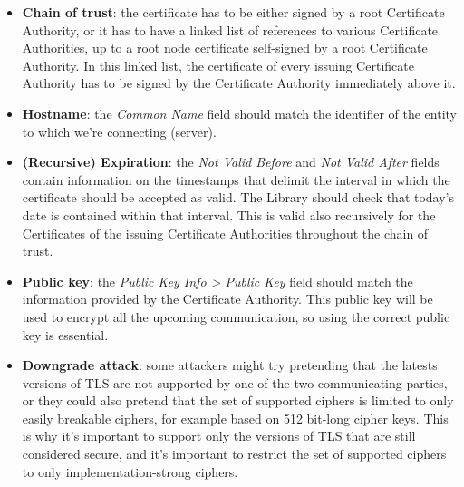 \documentclass[binding=0.6cm,noexaminfo]{sapthesis}
\begin{document}
\begin{itemize}
	\item \textbf{Chain of trust}: the certificate has to be either signed by a root Certificate Authority, or it has to have a linked list of references to various Certificate Authorities, up to a root node certificate self-signed by a root Certificate Authority. In this linked list, the certificate of every issuing Certificate Authority has to be signed by the Certificate Authority immediately above it.
	\item \textbf{Hostname}: the \textit{Common Name} field should match the identifier of the entity to which we’re connecting (server).
	\item \textbf{(Recursive) Expiration}: the \textit{Not Valid Before} and \textit{Not Valid After} fields contain information on the timestamps that delimit the interval in which the certificate should be accepted as valid. The Library should check that today's date is contained within that interval. This is valid also recursively for the Certificates of the issuing Certificate Authorities throughout the chain of trust.
	\item \textbf{Public key}: the \textit{Public Key Info > Public Key} field should match the information provided by the Certificate Authority. This public key will be used to encrypt all the upcoming communication, so using the correct public key is essential.
	\item \textbf{Downgrade attack}: some attackers might try pretending that the latests versions of TLS are not supported by one of the two communicating parties, or they could also pretend that the set of supported ciphers is limited to only easily breakable ciphers, for example based on 512 bit-long cipher keys. This is why it’s important to support only the versions of TLS that are still considered secure, and it’s important to restrict the set of supported ciphers to only implementation-strong ciphers.
\end{itemize}
\end{document}
